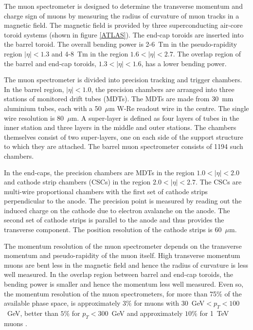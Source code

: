 The muon spectrometer \cite{:1999fq:Chapter1,:1999fq:Chapter6} is designed to determine the transverse momentum and charge sign of muons by measuring the radius of curvature of muon tracks in a magnetic field. The magnetic field is provided by three superconducting air-core toroid systems (shown in figure \ref{ATLAS}). 
The end-cap toroids are inserted into the barrel toroid. The overall bending power is 2-6~Tm in the pseudo-rapidity region $|\eta|<1.3$ and 4-8~Tm in the region $1.6<|\eta|<2.7$. The overlap region of the barrel and end-cap toroids, $1.3<|\eta|<1.6$, has a lower bending power.

The muon spectrometer is divided into precision tracking and trigger chambers. In the barrel region, $|\eta|<1.0$, the precision chambers are arranged into three stations of monitored drift tubes (MDTs). The MDTs are made from 30~mm aluminium tubes, each with a 50~$\mu$m W-Re readout wire in the centre. %
The single wire resolution is 80~$\mu$m. A super-layer is defined as four layers of tubes in the inner station and three layers in the middle and outer stations. The chambers themselves consist of two super-layers, one on each side of the support structure to which they are attached. The barrel muon spectrometer consists of 1194 such chambers.

In the end-caps, the precision chambers are MDTs in the region $1.0<|\eta|<2.0$ and cathode strip chambers (CSCs) in the region $2.0<|\eta|<2.7$. The CSCs are multi-wire proportional chambers with the first set of cathode strips perpendicular to the anode. The precision point is measured by reading out the induced charge on the cathode due to electron avalanche on the anode. The second set of cathode strips is parallel to the anode and thus provides the transverse component. The position resolution of the cathode strips is 60~$\mu$m.

The momentum resolution of the muon spectrometer depends on the transverse momentum and pseudo-rapidity of the muon itself. High transverse momentum muons are bent less in the magnetic field and hence the radius of curvature is less well measured. In the overlap region between barrel and end-cap toroids, the bending power is smaller and hence the momentum less well measured. Even so, the momentum resolution of the muon spectrometers, for more than 75\% of the available phase space, is approximately $3\%$ for muons with 30~GeV$ < p_T < 100$~GeV, better than $5\%$ for $p_T<300$~GeV  and approximately $10\%$ for 1~TeV muons \cite{:1999fq:Chapter6}. 

